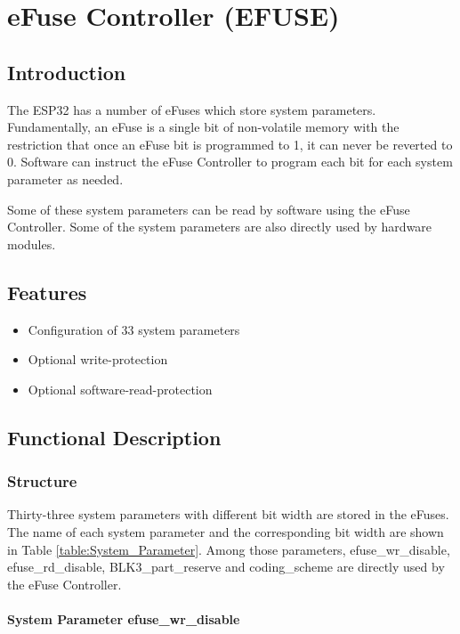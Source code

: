 \documentclass[main\_\_EN.tex]{subfiles}
\begin{document}
\hypertarget{efuse}{}
\chapter{eFuse Controller (EFUSE)}
\label{mod:efuse}
\section{Introduction}
The ESP32 has a number of eFuses which store system parameters. Fundamentally, an eFuse is a single bit of non-volatile memory with the restriction that once an eFuse bit is programmed to 1, it can never be reverted to 0. Software can instruct the eFuse Controller to program each bit for each system parameter as needed.

Some of these system parameters can be read by software using the eFuse Controller. Some of the system parameters are also directly used by hardware modules.

\section{Features}

\begin{itemize}
    \item Configuration of 33 system parameters
    \item Optional write-protection
    \item Optional software-read-protection
\end{itemize}

\section{Functional Description}
\subsection{Structure}

Thirty-three system parameters with different bit width are stored in the eFuses. The name of each system parameter and the corresponding bit width are shown in Table \ref{table:System_Parameter}. Among those parameters, efuse\_wr\_disable, efuse\_rd\_disable, BLK3\_part\_reserve and coding\_scheme are directly used by the eFuse Controller.


\subsubsection{System Parameter efuse\_wr\_disable}
\end{document}
